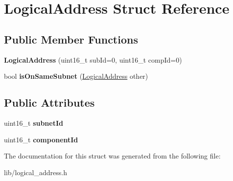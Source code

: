\hypertarget{structLogicalAddress}{}\section{Logical\+Address Struct Reference}
\label{structLogicalAddress}
\subsection*{Public Member Functions}
\begin{DoxyCompactItemize}
\item 
\mbox{\label{structLogicalAddress_a5ca025d24b9b8e2925814d3fc6607bd4}} 
{\bfseries Logical\+Address} (uint16\+\_\+t sub\+Id=0, uint16\+\_\+t comp\+Id=0)
\item 
\mbox{\label{structLogicalAddress_a9a8483eda7a165e0413a5b7334e47fc8}} 
bool {\bfseries is\+On\+Same\+Subnet} (\hyperlink{structLogicalAddress}{Logical\+Address} other)
\end{DoxyCompactItemize}
\subsection*{Public Attributes}
\begin{DoxyCompactItemize}
\item 
\mbox{\label{structLogicalAddress_a2ea7e86b6587adbfe03b16c7e0f0fe3b}} 
uint16\+\_\+t {\bfseries subnet\+Id}
\item 
\mbox{\label{structLogicalAddress_ac4f97357841656cd45f3183630b7af45}} 
uint16\+\_\+t {\bfseries component\+Id}
\end{DoxyCompactItemize}


The documentation for this struct was generated from the following file\+:\begin{DoxyCompactItemize}
\item 
lib/logical\+\_\+address.\+h\end{DoxyCompactItemize}
